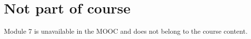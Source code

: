 \documentclass[../summary.tex]{subfiles}
\begin{document}
	
\section{Not part of course}
	
Module 7 is unavailable in the MOOC and does not belong to the course content.
	
\end{document}
